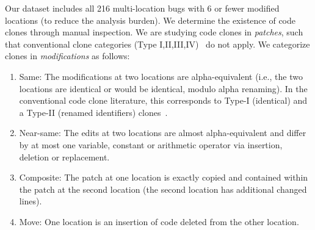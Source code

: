 \documentclass[10pt, conference]{IEEEtran}
\begin{document}
Our dataset includes all 216 multi-location bugs with 6 or fewer modified
locations (to reduce the analysis burden). We determine the existence of code 
clones through manual inspection.
%
%
%
We are studying code clones in \emph{patches}, such that conventional clone categories (Type I,II,III,IV)~\cite{convcodeclone} do not apply. We categorize clones in \emph{modifications} as follows:
\begin{enumerate}
\item Same: The modifications at two locations are alpha-equivalent (i.e., the two locations are identical or would be
identical, modulo alpha renaming). In the conventional code clone literature,
this corresponds to Type-I (identical) and a Type-II (renamed identifiers) clones~\cite{kclone}.
\item Near-same: The edits at two locations are almost alpha-equivalent and
  differ by at most one variable, constant or arithmetic operator via insertion, deletion or replacement.
\item Composite: The patch at one location is exactly copied and contained within the patch at 
the 
second location (the second location  has additional changed lines).
\item Move: One location is an insertion of 
code deleted from the other location. 
\end{enumerate}
\end{document}
